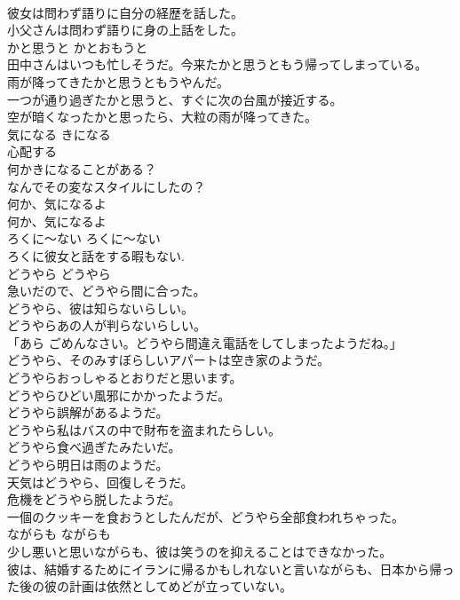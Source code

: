 \documentclass[8pt]{extreport}
\begin{document}
\begin{CJK}{UTF8}{min}
\\	彼女は問わず語りに自分の経歴を話した。   
\\	小父さんは問わず語りに身の上話をした。  
\\	かと思うと	かとおもうと	
\\	田中さんはいつも忙しそうだ。今来たかと思うともう帰ってしまっている。  
\\	雨が降ってきたかと思うともうやんだ。  
\\	一つが通り過ぎたかと思うと、すぐに次の台風が接近する。  
\\	空が暗くなったかと思ったら、大粒の雨が降ってきた。   
\\	気になる	きになる	
\\	心配する	
\\	何かきになることがある？   
\\	なんでその変なスタイルにしたの？ 
\\	何か、気になるよ   
\\	何か、気になるよ 
\\	ろくに〜ない	ろくに〜ない	
\\	ろくに彼女と話をする暇もない.  
\\	どうやら	どうやら	
\\	急いだので、どうやら間に合った。  
\\	どうやら、彼は知らないらしい。  
\\	どうやらあの人が判らないらしい。  
\\	「あら ごめんなさい。どうやら間違え電話をしてしまったようだね。」  
\\	どうやら、そのみすぼらしいアパートは空き家のようだ。  
\\	どうやらおっしゃるとおりだと思います。  
\\	どうやらひどい風邪にかかったようだ。  
\\	どうやら誤解があるようだ。  
\\	どうやら私はバスの中で財布を盗まれたらしい。  
\\	どうやら食べ過ぎたみたいだ。  
\\	どうやら明日は雨のようだ。  
\\	天気はどうやら、回復しそうだ。  
\\	危機をどうやら脱したようだ。  
\\	一個のクッキーを食おうとしたんだが、どうやら全部食われちゃった。   
\\	ながらも	ながらも	
\\	少し悪いと思いながらも、彼は笑うのを抑えることはできなかった。   
\\	彼は、結婚するためにイランに帰るかもしれないと言いながらも、日本から帰った後の彼の計画は依然としてめどが立っていない。   

\end{CJK}
\end{document}
